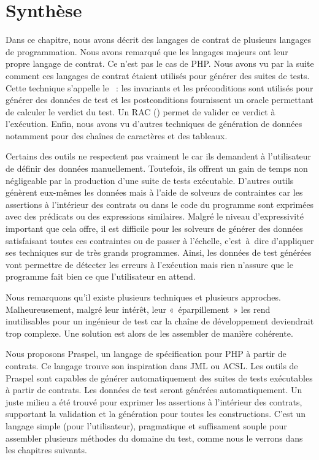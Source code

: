 \section{Synthèse}
\label{section:sota:summary}

Dans ce chapitre, nous avons décrit des langages de contrat de plusieurs
langages de programmation. Nous avons remarqué que les langages majeurs ont leur
propre langage de contrat. Ce n'est pas le cas de PHP. Nous avons vu par la
suite comment ces langages de contrat étaient utilisés pour générer des suites
de tests. Cette technique s'appelle le ~: les
invariants et les préconditions sont utilisés pour générer des données de test
et les postconditions fournissent un oracle permettant de calculer le verdict du
test. Un RAC () permet de valider ce
verdict à l'exécution. Enfin, nous avons vu d'autres techniques de génération de
données notamment pour des chaînes de caractères et des tableaux.

Certains des outils ne respectent pas vraiment le  car ils demandent à l'utilisateur de définir des données manuellement.
Toutefois, ils offrent un gain de temps non négligeable par la production d'une
suite de tests exécutable. D'autres outils génèrent eux-mêmes les données mais à
l'aide de solveurs de contraintes car les assertions à l'intérieur des contrats
ou dans le code du programme sont exprimées avec des prédicats ou des
expressions similaires. Malgré le niveau d'expressivité important que cela
offre, il est difficile pour les solveurs de générer des données satisfaisant
toutes ces contraintes ou de passer à l'échelle, c'est~à~dire d'appliquer ses
techniques sur de très grands programmes. Ainsi, les données de test générées
vont permettre de détecter les erreurs à l'exécution mais rien n'assure que le
programme fait bien ce que l'utilisateur en attend.

Nous remarquons qu'il existe plusieurs techniques et plusieurs approches.
Malheureusement, malgré leur intérêt, leur «~éparpillement~» les rend
inutilisables pour un ingénieur de test car la chaîne de développement
deviendrait trop complexe. Une solution est alors de les assembler de manière
cohérente.

Nous proposons Praspel, un langage de spécification pour PHP à partir de
contrats. Ce langage trouve son inspiration dans JML ou ACSL. Les outils de
Praspel sont capables de générer automatiquement des suites de tests exécutables
à partir de contrats. Les données de test seront générées automatiquement. Un
juste milieu a été trouvé pour exprimer les assertions à l'intérieur des
contrats, supportant la validation et la génération pour toutes les
constructions. C'est un langage simple (pour l'utilisateur), pragmatique et
suffisament souple pour assembler plusieurs méthodes du domaine du test, comme
nous le verrons dans les chapitres suivants.
